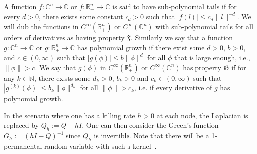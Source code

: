 \documentclass[a4paper, 11pt]{article}
\newcommand{\E}{\mathbb{E}}
\begin{document}
A function $f:\mathbb{C}^n\rightarrow \mathbb{C}$ or $f:\mathbb{R}_+^n\rightarrow \mathbb{C}$ is said to have sub-polynomial tails if for every $d>0$, there exists some constant $c_d>0$ such that $|f(l)|\leq c_d \|l\|^{-d}$. We will dub the functions in $C^\infty(\mathbb{R}_+^n)$ or $C^\infty(\mathbb{C}^n)$ with sub-polynomial tails for all orders of derivatives as having property $\mathfrak{F}$. Similarly we say that a function $g:\mathbb{C}^n\rightarrow \mathbb{C}$ or $g:\mathbb{R}_+^n\rightarrow \mathbb{C}$ has polynomial growth if there exist some $d > 0$, $b > 0$, and $c\in (0,\infty)$ such that $|g(\phi)|\leq b \|\phi\|^{d}$ for all $\phi$ that is large enough, i.e., $\|\phi\|>c$. We say that $g(\phi)$ in $C^\infty(\mathbb{R}_+^n)$ or $C^\infty(\mathbb{C}^n)$ has property $\mathfrak{G}$ if for any $k\in\mathbb{N}$, there exists some $d_k>0$, $b_k>0$ and $c_k \in (0,\infty)$  such that $|g^{(k)}(\phi)|\leq b_k \|\phi\|^{d_k}$ for all $\|\phi\|>c_k$, i.e. if every derivative of $g$ has polynomial growth.

In the scenario where one has a killing rate $h>0$ at each node, the Laplacian is replaced by $Q_h:=Q-hI$. One can then consider the Green's function $G_h:=(hI-Q)^{-1}$ since $Q_h$ is invertible. Note that there will be a 1-permanental random variable with such a kernel~\cite{ek09}.
\end{document}
